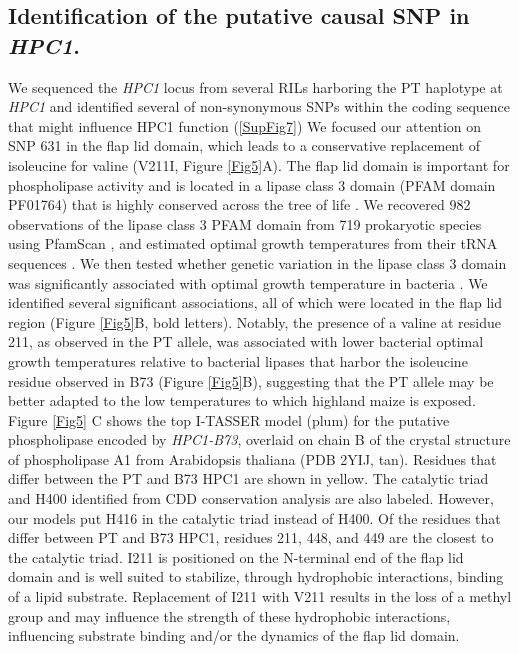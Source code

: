 \documentclass[9pt,twocolumn,twoside,lineno]{biorxiv}
\begin{document}
\subsection{Identification of the putative causal SNP in \textit{HPC1}.} 
We sequenced the \textit{HPC1} locus from several RILs harboring the PT haplotype at \textit{HPC1} and identified several of non-synonymous SNPs within the coding sequence that might influence HPC1 function (\ref{SupFig7})
We focused our attention on SNP 631 in the flap lid domain, which leads to a conservative replacement of isoleucine for valine (V211I, Figure \ref{Fig5}A).  
The flap lid domain is important for phospholipase activity and is located in a lipase class 3 domain (PFAM domain PF01764) that is highly conserved across the tree of life \cite{Jensen2021-zm}. 
We recovered 982 observations of the lipase class 3 PFAM domain from 719 prokaryotic species using PfamScan \cite{Potter2018-tk, El-Gebali2019-pw}, and estimated optimal growth temperatures from their tRNA sequences \cite{Cimen2020-dm}.
We then tested whether genetic variation in the lipase class 3 domain was significantly associated with optimal growth temperature in bacteria \cite{Jensen2021-iv}. 
We identified several significant associations, all of which were located in the flap lid region (Figure \ref{Fig5}B, bold letters).  
Notably, the presence of a valine at residue 211, as observed in the PT allele, was associated with lower bacterial optimal growth temperatures relative to bacterial lipases that harbor the isoleucine residue observed in B73 (Figure \ref{Fig5}B), suggesting that the PT allele may be better adapted to the low temperatures to which highland maize is exposed.
Figure \ref{Fig5} C shows the top I-TASSER model (plum) for the putative phospholipase encoded by \textit{HPC1-B73}, overlaid on chain B of the crystal structure of phospholipase A1 from Arabidopsis thaliana (PDB 2YIJ, tan). 
Residues that differ between the PT and B73 HPC1 are shown in yellow. 
The catalytic triad and H400 identified from CDD conservation analysis are also labeled.
However, our models put H416 in the catalytic triad instead of H400. 
Of the residues that differ between PT and B73 HPC1, residues 211, 448, and 449 are the closest to the catalytic triad. 
I211 is positioned on the N-terminal end of the flap lid domain and is well suited to stabilize, through hydrophobic interactions, binding of a lipid substrate.
Replacement of I211 with V211 results in the loss of a methyl group and may influence the strength of these hydrophobic interactions, influencing substrate binding and/or the dynamics of the flap lid domain.
\end{document}
